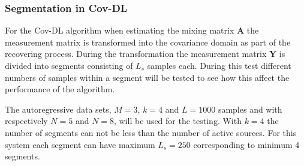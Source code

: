 %

\subsubsection{Segmentation in Cov-DL}
For the Cov-DL algorithm when estimating the mixing matrix $\mathbf{A}$ the measurement matrix is transformed into the covariance domain as part of the recovering process. During the transformation the measurement matrix $\mathbf{Y}$ is divided into segments consisting of $L_s$ samples each.
During this test different numbers of samples within a segment will be tested to see how this affect the performance of the algorithm.

The autoregressive data sets,  $M = 3$, $k = 4$ and $L = 1000$ samples and with respectively $N = 5$ and $N=8$, will be used for the testing. With $k = 4$ the number of segments can not be less than the number of active sources. For this system each segment can have maximum $L_s = 250$ corresponding to minimum 4 segments. 

